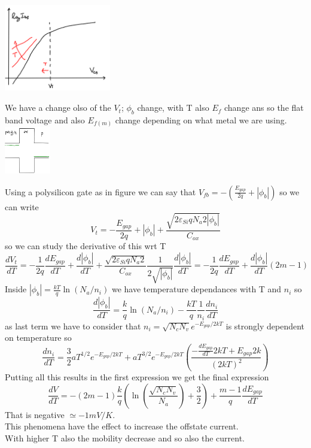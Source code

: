 \centering
\includegraphics[width=0.35\textwidth]{tchange.png}\\
\raggedright

We have a change olso of the $V_t$; $\phi_b$ change, with T also $E_f$ change ans so the flat band voltage and also $E_{f(m)}$ change depending on what metal we are using.\\


\centering
\includegraphics[width=0.15\textwidth]{1tchange.png}\\
\raggedright


Using a polysilicon gate as in figure we can say that $V_{fb}=-(\frac{E_{gap}}{2q}+|\phi_b|)$ so we can write 
\begin{equation}
V_t=-\frac{E_{gap}}{2q}+|\phi_b|+\frac{\sqrt{2\varepsilon_{Si}qN_a2|\phi_b|}}{C_{ox}}
\end{equation}
so we can study the derivative of this wrt T
\begin{equation}
\frac{dV_t}{dT}=-\frac{1}{2q}\frac{dE_{gap}}{dT}+\frac{d|\phi_b|}{dT}+\frac{\sqrt{2\varepsilon_{Si}qN_a2}}{C_{ox}}\frac{1}{2\sqrt{|\phi_b|}}\frac{d|\phi_b|}{dT}=-\frac{1}{2q}\frac{dE_{gap}}{dT}+\frac{d|\phi_b|}{dT}(2m-1)
\end{equation}
Inside $|\phi_b|=\frac{kT}{q}\ln(N_a/n_i)$ we have temperature dependances with T and $n_i$ so 
\begin{equation}
\frac{d|\phi_b|}{dT}=\frac{k}{q}\ln(N_a/n_i)-\frac{kT}{q}\frac{1}{n_i}\frac{dn_i}{dT}
\end{equation}
as last term we have to consider that $n_i=\sqrt{N_cN_v}e^{-E_{gap}/2kT}$ is strongly dependent on temperature so 
\begin{equation}
\frac{dn_i}{dT}=\frac{3}{2}aT^{1/2}e^{-E_{gap}/2kT}+aT^{3/2}e^{-E_{gap}/2kT}\left(\frac{-\frac{dE_{gap}}{dT}2kT+E_{gap}2k}{(2kT)^2}\right)
\end{equation}
Putting all this results in the first expression we get the final expression
\begin{equation}
\frac{dV}{dT}=-(2m-1)\frac{k}{q}\left(\ln(\frac{\sqrt{N_cN_v}}{N_a})+\frac{3}{2}\right) +\frac{m-1}{q}\frac{dE_{gap}}{dT}
\end{equation}
That is negative $\simeq -1mV/K$.\\
This phenomena have the effect to increase the offstate current.\\
With higher T also the mobility decrease and so also the current.\\



